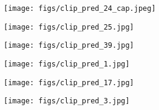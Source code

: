 \documentclass[10pt,twocolumn,letterpaper]{article}
\begin{document}
\begin{figure}[!t]
    \begin{subfigure}{0.17\linewidth}
        \centering
        \texttt{[image: figs/clip\_pred\_24\_cap.jpeg]}
        \vspace{-5mm}
    \end{subfigure}
    \begin{subfigure}{0.132\linewidth}
        \centering
        \texttt{[image: figs/clip\_pred\_25.jpg]}
        \vspace{-5mm}
    \end{subfigure}
    \begin{subfigure}{0.142\linewidth}
        \centering
        \texttt{[image: figs/clip\_pred\_39.jpg]}
        \vspace{-5mm}
    \end{subfigure}
    \begin{subfigure}{0.142\linewidth}
        \centering
        \texttt{[image: figs/clip\_pred\_1.jpg]}
        \vspace{-5mm}
    \end{subfigure}
    \begin{subfigure}{0.136\linewidth}
        \centering
        \texttt{[image: figs/clip\_pred\_17.jpg]}
        \vspace{-5mm}
    \end{subfigure}
    \begin{subfigure}{0.135\linewidth}
        \centering
        \texttt{[image: figs/clip\_pred\_3.jpg]}
        \vspace{-5mm}
    \end{subfigure}


\end{figure}
\end{document}
